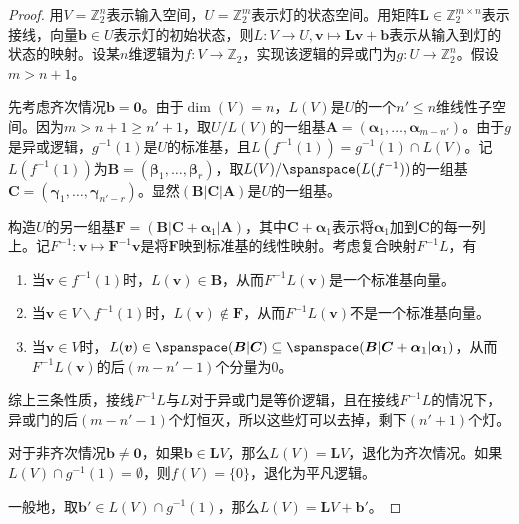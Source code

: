 \begin{proof}
	用$V=\mathbb{Z}_2^n$表示输入空间，$U=\mathbb{Z}_2^m$表示灯的状态空间。用矩阵$\boldsymbol{L}\in\mathbb{Z}_2^{m\times n}$表示接线，向量$\boldsymbol{b}\in U$表示灯的初始状态，则$L:V\to U, \boldsymbol{v}\mapsto \boldsymbol{L}\boldsymbol{v}+\boldsymbol{b}$表示从输入到灯的状态的映射。设某$n$维逻辑为$f:V\to\mathbb{Z}_2$，实现该逻辑的异或门为$g:U\to \mathbb{Z}_2^n$。假设$m>n+1$。
	
	先考虑齐次情况$\boldsymbol{b}=\boldsymbol{0}$。由于$\dim(V)=n$，$L(V)$是$U$的一个$n'\le n$维线性子空间。因为$m>n+1\ge n'+1$，取$U/L(V)$的一组基$\boldsymbol{A}=(\boldsymbol{\alpha}_1,\dots,\boldsymbol{\alpha}_{m-n'})$。由于$g$是异或逻辑，$g^{-1}(1)$是$U$的标准基，且$L(f^{-1}(1))=g^{-1}(1)\cap L(V)$。记$L(f^{-1}(1))$为$\boldsymbol{B}=(\boldsymbol{\beta}_1,\dots,\boldsymbol{\beta}_r)$，取$L(V)/\spanspace(L(f^{-1}))$的一组基$\boldsymbol{C}=(\boldsymbol{\gamma}_1,\dots,\boldsymbol{\gamma}_{n'-r})$。显然$(\boldsymbol{B}|\boldsymbol{C}|\boldsymbol{A})$是$U$的一组基。
	
	构造$U$的另一组基$\boldsymbol{F}=(\boldsymbol{B}|\boldsymbol{C}+\boldsymbol{\alpha}_1|\boldsymbol{A})$，其中$\boldsymbol{C}+\boldsymbol{\alpha}_1$表示将$\boldsymbol{\alpha}_1$加到$\boldsymbol{C}$的每一列上。记$F^{-1}:\boldsymbol{v}\mapsto\boldsymbol{F}^{-1}\boldsymbol{v}$是将$\boldsymbol{F}$映到标准基的线性映射。考虑复合映射$F^{-1}L$，有
	\begin{enumerate}
		\item 当$\boldsymbol{v}\in f^{-1}(1)$时，$L(\boldsymbol{v})\in\boldsymbol{B}$，从而$F^{-1}L(\boldsymbol{v})$是一个标准基向量。
		\item 当$\boldsymbol{v}\in V\backslash f^{-1}(1)$时，$L(\boldsymbol{v})\notin\boldsymbol{F}$，从而$F^{-1}L(\boldsymbol{v})$不是一个标准基向量。
		\item 当$\boldsymbol{v}\in V$时，$L(\boldsymbol{v})\in\spanspace(\boldsymbol{B}|\boldsymbol{C})\subseteq\spanspace(\boldsymbol{B}|\boldsymbol{C}+\boldsymbol{\alpha}_1|\boldsymbol{\alpha}_1)$，从而$F^{-1}L(\boldsymbol{v})$的后$(m-n'-1)$个分量为0。
	\end{enumerate}
	综上三条性质，接线$F^{-1}L$与$L$对于异或门是等价逻辑，且在接线$F^{-1}L$的情况下，异或门的后$(m-n'-1)$个灯恒灭，所以这些灯可以去掉，剩下$(n'+1)$个灯。
	
	对于非齐次情况$\boldsymbol{b}\ne\boldsymbol{0}$，如果$\boldsymbol{b}\in \boldsymbol{L}V$，那么$L(V)=\boldsymbol{L}V$，退化为齐次情况。如果$L(V)\cap g^{-1}(1)=\emptyset$，则$f(V)=\{0\}$，退化为平凡逻辑。
	
	一般地，取$\boldsymbol{b}'\in L(V)\cap g^{-1}(1)$，那么$L(V)=\boldsymbol{L}V+\boldsymbol{b}'$。
\end{proof}

